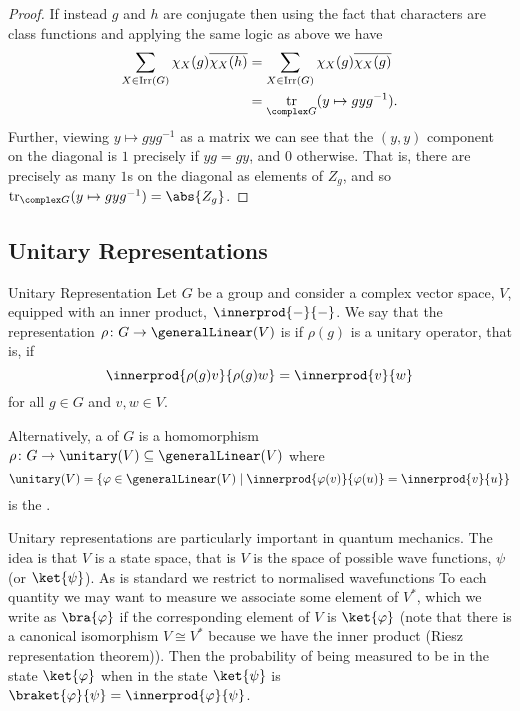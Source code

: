 \documentclass[fleqn]{NotesClass}
\newcommand{\isomorphic}{\cong}
\DeclareMathOperator{\Irr}{Irr}
\DeclareMathOperator{\tr}{tr}
\begin{document}
\begin{thm}{}{}
\begin{proof}
            If instead \(g\) and \(h\) are conjugate then using the fact that characters are class functions and applying the same logic as above we have
            \begin{align}
                \sum_{X \in \Irr(G)} \chi_X(g) \overline{\chi_X(h)} &= \sum_{X \in \Irr(G)} \chi_X(g) \overline{\chi_X(g)}\\
                &= \tr_{\complex G}(y \mapsto gyg^{-1}).
            \end{align}
            Further, viewing \(y \mapsto gyg^{-1}\) as a matrix we can see that the \((y, y)\) component on the diagonal is \(1\) precisely if \(yg = gy\), and \(0\) otherwise.
            That is, there are precisely as many \(1\)s on the diagonal as elements of \(Z_g\), and so \(\tr_{\complex G}(y \mapsto gyg^{-1}) = \abs{Z_g}\).
        \end{proof}
    \end{thm}
    
    \subsection{Unitary Representations}
    \begin{dfn}{Unitary Representation}{}
        Let \(G\) be a group and consider a complex vector space, \(V\), equipped with an inner product, \(\innerprod{-}{-}\).
        We say that the representation \(\rho \colon G \to \generalLinear(V)\) is  if \(\rho(g)\) is a unitary operator, that is, if
        \begin{equation}
            \innerprod{\rho(g)v}{\rho(g)w} = \innerprod{v}{w}
        \end{equation}
        for all \(g \in G\) and \(v, w \in V\).
        
        Alternatively, a  of \(G\) is a homomorphism \(\rho \colon G \to \unitary(V) \subseteq \generalLinear(V)\) where
        \begin{equation}
            \unitary(V) = \{\varphi \in \generalLinear(V) \mid \innerprod{\varphi(v)}{\varphi(u)} = \innerprod{v}{u}\}
        \end{equation}
        is the .
    \end{dfn}
    
    Unitary representations are particularly important in quantum mechanics.
    The idea is that \(V\) is a state space, that is \(V\) is the space of possible wave functions, \(\psi\) (or \(\ket{\psi}\)).
    As is standard we restrict to normalised wavefunctions
    To each quantity we may want to measure we associate some element of \(V^*\), which we write as \(\bra{\varphi}\) if the corresponding element of \(V\) is \(\ket{\varphi}\) (note that there is a canonical isomorphism \(V \isomorphic V^*\) because we have the inner product (Riesz representation theorem)).
    Then the probability of being measured to be in the state \(\ket{\varphi}\) when in the state \(\ket{\psi}\) is \(\braket{\varphi}{\psi} = \innerprod{\varphi}{\psi}\).
    
\end{document}
